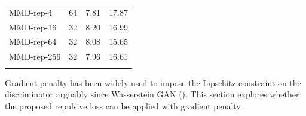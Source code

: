 \documentclass{article} %
\theoremstyle{plain}
\newtheorem*{proposition 1*}{Proposition 1}
\def\toprule{\noalign{\smallskip\hrule height 1.2pt\smallskip}}
\let\bottomrule=\toprule
\begin{document}
\begin{appendices}
\begin{table}[t]
\begin{minipage}{0.48\linewidth}
\begin{threeparttable}
\begin{tabular}{L{2.2cm} c c c}
				MMD-rep-4 & 64 & 7.81 & 17.87 \\
				MMD-rep-16 & 32 & 8.20 & 16.99 \\
				MMD-rep-64 & 32 & 8.08 & 15.65 \\
				MMD-rep-256 & 32 & 7.96 & 16.61 \\
				\bottomrule
			\end{tabular}

		\end{threeparttable}
	\end{minipage}
\end{table}

Gradient penalty has been widely used to impose the Lipschitz constraint on the discriminator arguably since Wasserstein GAN (\cite{wgan_gp}). This section explores whether the proposed repulsive loss can be applied with gradient penalty. 


\end{appendices}
\end{document}
